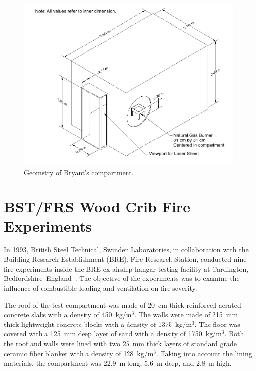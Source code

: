 \begin{figure}[ht]
\includegraphics[width=\textwidth]{FIGURES/Bryant_Doorway/Bryant_Compartment}
\caption[Geometry of Bryant's compartment]{Geometry of Bryant's compartment.}
\label{Bryant_Drawing}
\end{figure}

\section{BST/FRS Wood Crib Fire Experiments}
\label{BST_FRS_wood_cribs_description}

In 1993, British Steel Technical, Swinden Laboratories, in collaboration with the Building Research Establishment (BRE), Fire Research Station, conducted nine fire experiments inside the BRE ex-airship hangar testing facility at Cardington, Bedfordshire, England~\cite{BST_FRS:1994}. The objective of the experiments was to examine the influence of combustible loading and ventilation on fire severity.

The roof of the test compartment was made of 20~cm thick reinforced aerated concrete slabs with a density of 450~kg/m$^3$. The walls were made of 215~mm thick lightweight concrete blocks with a density of 1375~kg/m$^3$. The floor was covered with a 125~mm deep layer of sand with a density of 1750~kg/m$^3$. Both the roof and walls were lined with two 25~mm thick layers of standard grade ceramic fiber blanket with a density of 128~kg/m$^3$. Taking into account the lining materials, the compartment was 22.9~m long, 5.6~m deep, and 2.8~m high.

